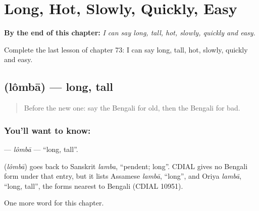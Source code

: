 
\chapter{Long, Hot, Slowly, Quickly, Easy}
\label{ch:bn-long-hot-slowly-quickly-easy}

\begin{chapteropening}
\textbf{By the end of this chapter:} \emph{I can say long, tall, hot, slowly, quickly and easy.}

Complete the last lesson of chapter 73: I can say long, tall, hot, slowly, quickly and easy.
\end{chapteropening}

\section[\texorpdfstring{\bn{লম্বা} (lômbā)}{লম্বা (lômbā)}]{ (lômbā) — long, tall}

\label{lesson:BN-C73-lomba}



\begin{quote}
Before the new one: say the Bengali for old, then the Bengali for bad.
\end{quote}

\subsection*{You'll want to know: }
\textbf{} — \emph{lômbā} — \textquotedblleft{}long, tall\textquotedblright{}.

\begin{cousinweb}
\textbf{} (\emph{lômbā}) goes back to Sanskrit \emph{lamba}, \textquotedblleft{}pendent; long\textquotedblright{}. CDIAL gives no Bengali form under that entry, but it lists Assamese \emph{lambā}, \textquotedblleft{}long\textquotedblright{}, and Oriya \emph{lambā}, \textquotedblleft{}long, tall\textquotedblright{}, the forms nearest to Bengali (CDIAL 10951).
\end{cousinweb}

\begin{grammarlens}[title={What you've built}]
One more word for this chapter.
\end{grammarlens}

